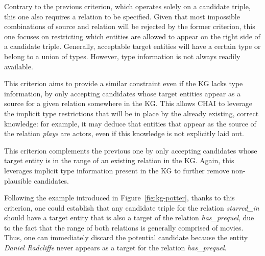 Contrary to the previous criterion, which operates solely on a candidate triple, this one also requires a relation to be specified. Given that most impossible combinations of source and relation will be rejected by the former criterion, this one focuses on restricting which entities are allowed to appear on the right side of a candidate triple. Generally, acceptable target entities will have a certain type or belong to a union of types. However, type information is not always readily available. 

This criterion aims to provide a similar constraint even if the KG lacks type information, by only accepting candidates whose target entities appear as a source for a given relation somewhere in the KG. This allows CHAI to leverage the implicit type restrictions that will be in place by the already existing, correct knowledge: for example, it may deduce that entities that appear as the source of the relation \textit{plays} are actors, even if this knowledge is not explicitly laid out.


This criterion complements the previous one by only accepting candidates whose target entity is in the range of an existing relation in the KG. Again, this leverages implicit type information present in the KG to further remove non-plausible candidates. 

Following the example introduced in Figure~\ref{fig:kg-potter}, thanks to this criterion, one could establish that any candidate triple for the relation \textit{starred\_in} should have a target entity that is also a target of the relation \textit{has\_prequel}, due to the fact that the range of both relations is generally comprised of movies. Thus, one can immediately discard the potential candidate  because the entity \textit{Daniel Radcliffe} never appears as a target for the relation \textit{has\_prequel}.


